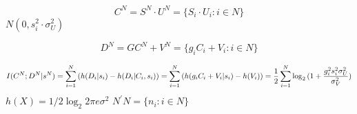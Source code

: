 \begin{equation}
C^N= S^N \cdot U^N = \{ S_i\cdot U_i : i \in N \}
\end{equation}
$N(0, s_i^2 \cdot \sigma^2_U)$

\begin{equation}
D^N= GC^N + V^N = \{ g_i C_i + V_i : i \in N \}
\end{equation}

\begin{equation}
I(C^N; D^N|s^N)  = \sum_{i=1}^N{(h(D_i|s_i)-h(D_i|C_i,s_i))} \\
= \sum_{i=1}^N{(h( g_i C_i + V_i|s_i)-h(V_i))} \\
= \frac{1}{2}\sum_{i=1}^N{\log_2{(1+\frac{g_i^2s_i^2\sigma^2_U}{\sigma^2_V})}}
\end{equation}
$h(X)=1/2\log_2{2\pi e \sigma^2}$
$N^\prime N = \{ n_i : i \in N \} $